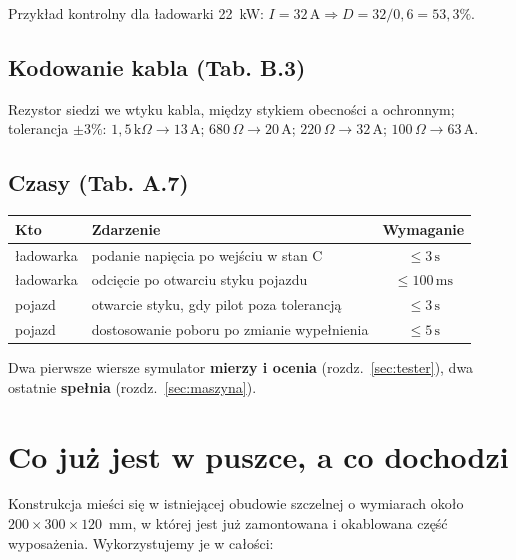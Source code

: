 \documentclass[a4paper,11pt]{article}
\newcommand{\ohm}{\,\Omega}
\newcommand{\kohm}{\,\mathrm{k}\Omega}
\newcommand{\amp}{\,\mathrm{A}}
\newcommand{\ms}{\,\mathrm{ms}}
\newcommand{\sek}{\,\mathrm{s}}
\begin{document}
Przykład kontrolny dla ładowarki 22~kW: $I=32\amp \Rightarrow D = 32/0{,}6 = 53{,}3\%$.

\subsection{Kodowanie kabla (Tab. B.3)}

Rezystor siedzi we wtyku kabla, między stykiem obecności a ochronnym; tolerancja
$\pm3\%$: $1{,}5\kohm \to 13\amp$; $680\ohm \to 20\amp$; $220\ohm \to 32\amp$;
$100\ohm \to 63\amp$.

\subsection{Czasy (Tab. A.7)}

\begin{center}
\begin{tabular}{llc}
\toprule
Kto & Zdarzenie & Wymaganie \\
\midrule
ładowarka & podanie napięcia po wejściu w stan C & $\le 3\sek$ \\
ładowarka & odcięcie po otwarciu styku pojazdu   & $\le 100\ms$ \\
pojazd    & otwarcie styku, gdy pilot poza tolerancją & $\le 3\sek$ \\
pojazd    & dostosowanie poboru po zmianie wypełnienia & $\le 5\sek$ \\
\bottomrule
\end{tabular}
\end{center}

Dwa pierwsze wiersze symulator \textbf{mierzy i ocenia} (rozdz.~\ref{sec:tester}),
dwa ostatnie \textbf{spełnia} (rozdz.~\ref{sec:maszyna}).

\section{Co już jest w puszce, a co dochodzi}

Konstrukcja mieści się w istniejącej obudowie szczelnej o wymiarach około
$200\times300\times120$~mm, w której jest już zamontowana i okablowana część
wyposażenia. Wykorzystujemy je w całości:
\end{document}
